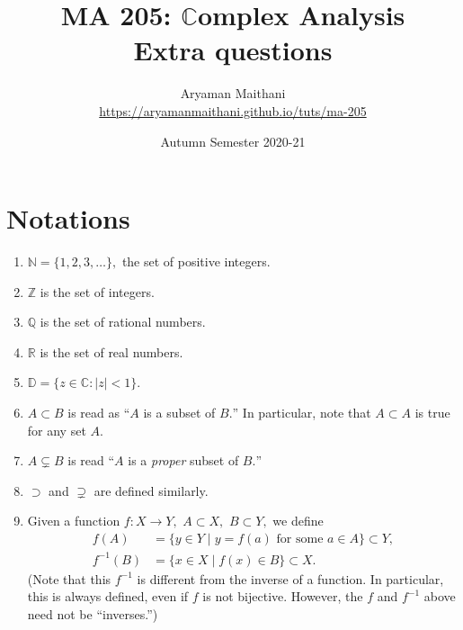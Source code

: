 \documentclass[12pt]{article}
\title{MA 205: $\mathbb{C}$omplex Analysis\\\large{Extra questions}}
\author{Aryaman Maithani\\\url{https://aryamanmaithani.github.io/tuts/ma-205}}
\date{Autumn Semester 2020-21}
\theoremstyle{definition}
\numberwithin{thm}{section}
\newcommand{\md}[1]{{\left\lvert #1 \right\lvert}}
\begin{document}
\maketitle
\setcounter{section}{-1}
\tableofcontents
\newpage\section{Notations} \label{sec:notations}
\begin{enumerate}
	\item $\mathbb{N} = \{1, 2, 3, \ldots\},$ the set of positive integers.
	\item $\mathbb{Z}$ is the set of integers.
	\item $\mathbb{Q}$ is the set of rational numbers.
	\item $\mathbb{R}$ is the set of real numbers.
	\item $\mathbb{D} = \{z \in \mathbb{C} : \md{z} < 1\}$.
	\item $A \subset B$ is read as ``$A$ is a subset of $B.$'' In particular, note that $A \subset A$ is true for any set $A.$
	\item $A \subsetneq B$ is read ``$A$ is a \emph{proper} subset of $B.$''
	\item $\supset$ and $\supsetneq$ are defined similarly.
	\item Given a function $f:X \to Y,$ $A \subset X,$ $B \subset Y,$ we define
	\begin{align*} 
		f(A) &= \{y \in Y \mid y = f(a) \text{ for some } a \in A\} \subset Y,\\
		f^{-1}(B) &= \{x \in X \mid f(x) \in B\} \subset X.
	\end{align*}
	(Note that this $f^{-1}$ is different from the inverse of a function. In particular, this is always defined, even if $f$ is not bijective. However, the $f$ and $f^{-1}$ above need not be ``inverses.'')

\end{enumerate}
\end{document}

